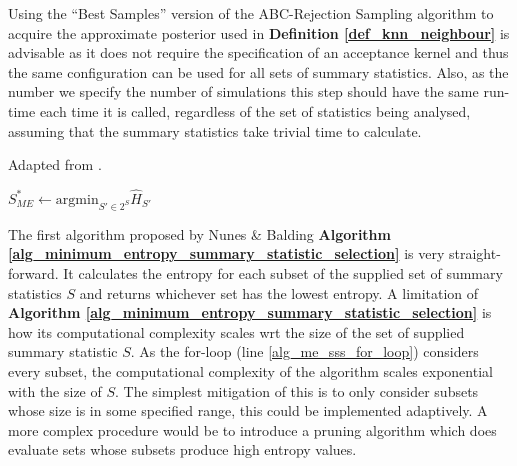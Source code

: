 \documentclass[11pt,a4paper]{article}
\theoremstyle{break}
\begin{document}
  \par Using the ``Best Samples'' version of the ABC-Rejection Sampling algorithm to acquire the approximate posterior used in \textbf{Definition \ref{def_knn_neighbour}} is advisable as it does not require the specification of an acceptance kernel and thus the same configuration can be used for all sets of summary statistics. Also, as the number we specify the number of simulations this step should have the same run-time each time it is called, regardless of the set of statistics being analysed, assuming that the summary statistics take trivial time to calculate.

  \begin{box_algorithm}\label{alg_minimum_entropy_summary_statistic_selection}
    Adapted from \cite[]{on_optimal_selection_of_summary_stats_for_ABC}.
    \begin{algorithm}[H]
      $S_{ME}^*\leftarrow\text{argmin}_{S'\in 2^S}\hat{H}_{S'}$\\
    \end{algorithm}
  \end{box_algorithm}

  \par The first algorithm proposed by Nunes \& Balding \textbf{Algorithm \ref{alg_minimum_entropy_summary_statistic_selection}} is very straight-forward. It calculates the entropy for each subset of the supplied set of summary statistics $S$ and returns whichever set has the lowest entropy. A limitation of \textbf{Algorithm \ref{alg_minimum_entropy_summary_statistic_selection}} is how its computational complexity scales wrt the size of the set of supplied summary statistic $S$. As the for-loop (line \ref{alg_me_sss_for_loop}) considers every subset, the computational complexity of the algorithm scales exponential with the size of $S$. The simplest mitigation of this is to only consider subsets whose size is in some specified range, this could be implemented adaptively. A more complex procedure would be to introduce a pruning algorithm which does evaluate sets whose subsets produce high entropy values.
\end{document}
